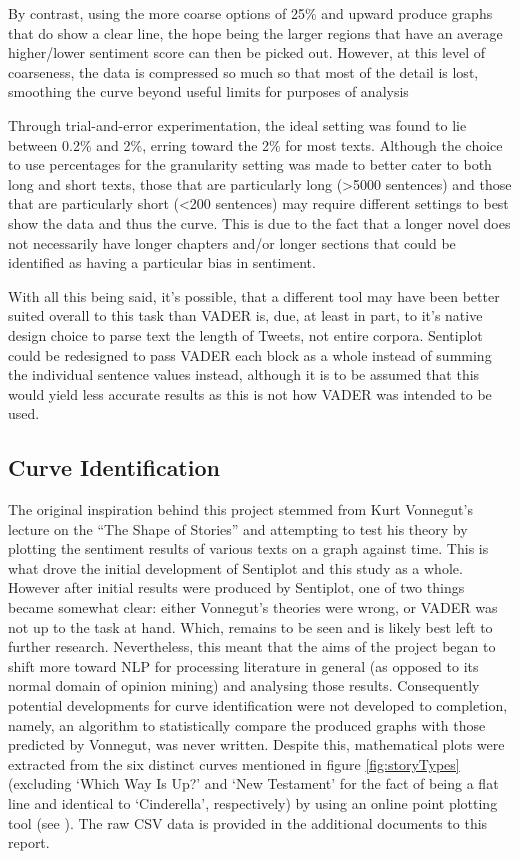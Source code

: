 \documentclass{article}
\begin{document}
        By contrast, using the more coarse options of 25\% and upward produce graphs that do show a clear line, the hope being the larger regions that have an average higher/lower sentiment score can then be picked out. However, at this level of coarseness, the data is compressed so much so that most of the detail is lost, smoothing the curve beyond useful limits for purposes of analysis

        Through trial-and-error experimentation, the ideal setting was found to lie between 0.2\% and 2\%, erring toward the 2\% for most texts. Although the choice to use percentages for the granularity setting was made to better cater to both long and short texts, those that are particularly long (>5000 sentences) and those that are particularly short (<200 sentences) may require different settings to best show the data and thus the curve. This is due to the fact that a longer novel does not necessarily have longer chapters and/or longer sections that could be identified as having a particular bias in sentiment.
        
        With all this being said, it's possible, that a different tool may have been better suited overall to this task than VADER is, due, at least in part, to it's native design choice to parse text the length of Tweets, not entire corpora. Sentiplot could be redesigned to pass VADER each block as a whole instead of summing the individual sentence values instead, although it is to be assumed that this would yield less accurate results as this is not how VADER was intended to be used.
    \subsection{Curve Identification}
    \label{subsec:curves}
        The original inspiration behind this project stemmed from Kurt Vonnegut's lecture on the ``The Shape of Stories'' and attempting to test his theory by plotting the sentiment results of various texts on a graph against time. This is what drove the initial development of Sentiplot and this study as a whole. However after initial results were produced by Sentiplot, one of two things became somewhat clear: either Vonnegut's theories were wrong, or VADER was not up to the task at hand. Which, remains to be seen and is likely best left to further research. Nevertheless, this meant that the aims of the project began to shift more toward NLP for processing literature in general (as opposed to its normal domain of opinion mining) and analysing those results. Consequently potential developments for curve identification were not developed to completion, namely, an algorithm to statistically compare the produced graphs with those predicted by Vonnegut, was never written. Despite this, mathematical plots were extracted from the six distinct curves mentioned in figure \ref{fig:storyTypes} (excluding `Which Way Is Up?' and `New Testament' for the fact of being a flat line and identical to `Cinderella', respectively) by using an online point plotting tool (see \cite{webPlotDigitizer}). The raw CSV data is provided in the additional documents to this report.
\end{document}
